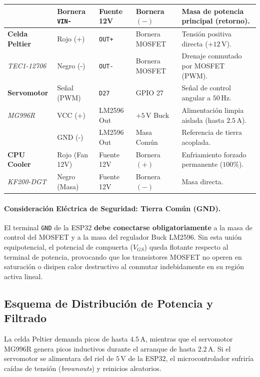 \begin{table}[htbp]
\begin{tabularx}{\textwidth}{@{}l l l l L@{}}
 & Bornera \texttt{VIN-} & Fuente 12V & Bornera $(-)$ & Masa de potencia principal (retorno). \\ \midrule
\textbf{Celda Peltier} & Rojo (+) & \texttt{OUT+} & Bornera MOSFET & Tensión positiva directa ($+12\,\text{V}$). \\
\textit{TEC1-12706} & Negro (-) & \texttt{OUT-} & Bornera MOSFET & Drenaje conmutado por MOSFET (PWM). \\ \midrule
\textbf{Servomotor} & Señal (PWM) & \texttt{D27} & GPIO 27 & Señal de control angular a $50\,\text{Hz}$. \\
\textit{MG996R} & VCC (+) & LM2596 Out & $+5\,\text{V}$ Buck & Alimentación limpia aislada (hasta $2.5\,\text{A}$). \\
 & GND (-) & LM2596 Out & Masa Común & Referencia de tierra acoplada. \\ \midrule
\textbf{CPU Cooler} & Rojo (Fan 12V) & Fuente 12V & Bornera $(+)$ & Enfriamiento forzado permanente ($100\%$). \\
\textit{KF200-DGT} & Negro (Masa) & Fuente 12V & Bornera $(-)$ & Masa directa. \\ \bottomrule
\end{tabularx}
\end{table}

\paragraph{Consideración Eléctrica de Seguridad: Tierra Común (GND).}
El terminal \texttt{GND} de la ESP32 \textbf{debe conectarse obligatoriamente} a la masa de control del MOSFET y a la masa del regulador Buck LM2596. Sin esta unión equipotencial, el potencial de compuerta ($V_{GS}$) queda flotante respecto al terminal de potencia, provocando que los transistores MOSFET no operen en saturación o disipen calor destructivo al conmutar indebidamente en su región activa lineal.

\subsection{Esquema de Distribución de Potencia y Filtrado}
La celda Peltier demanda picos de hasta $4.5\,\text{A}$, mientras que el servomotor MG996R genera picos inductivos durante el arranque de hasta $2.2\,\text{A}$. Si el servomotor se alimentara del riel de $5\,\text{V}$ de la ESP32, el microcontrolador sufriría caídas de tensión (\textit{brownouts}) y reinicios aleatorios.

